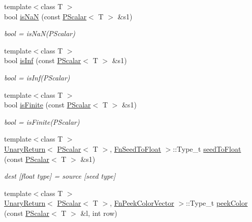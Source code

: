 \begin{DoxyCompactItemize}
{\footnotesize template$<$class T $>$ }\\bool \mbox{\hyperlink{group__primscalar_ga45c19c10ac52adfa3deff1ead05f3dbc}{is\+NaN}} (const \mbox{\hyperlink{classENSEM_1_1PScalar}{P\+Scalar}}$<$ T $>$ \&s1)
\begin{DoxyCompactList}\small\item\em bool = is\+Na\+N(\+P\+Scalar) \end{DoxyCompactList}\item 
{\footnotesize template$<$class T $>$ }\\bool \mbox{\hyperlink{group__primscalar_gadaa3bcd952c27bc79132fc1037584dcc}{is\+Inf}} (const \mbox{\hyperlink{classENSEM_1_1PScalar}{P\+Scalar}}$<$ T $>$ \&s1)
\begin{DoxyCompactList}\small\item\em bool = is\+Inf(\+P\+Scalar) \end{DoxyCompactList}\item 
{\footnotesize template$<$class T $>$ }\\bool \mbox{\hyperlink{group__primscalar_ga3dab2cae6c55a7a86676323b203a758d}{is\+Finite}} (const \mbox{\hyperlink{classENSEM_1_1PScalar}{P\+Scalar}}$<$ T $>$ \&s1)
\begin{DoxyCompactList}\small\item\em bool = is\+Finite(\+P\+Scalar) \end{DoxyCompactList}\item 
{\footnotesize template$<$class T $>$ }\\\mbox{\hyperlink{structENSEM_1_1UnaryReturn}{Unary\+Return}}$<$ \mbox{\hyperlink{classENSEM_1_1PScalar}{P\+Scalar}}$<$ T $>$, \mbox{\hyperlink{structENSEM_1_1FnSeedToFloat}{Fn\+Seed\+To\+Float}} $>$\+::Type\+\_\+t \mbox{\hyperlink{group__primscalar_ga5a261606d393edcbce00c050e5a5cbd5}{seed\+To\+Float}} (const \mbox{\hyperlink{classENSEM_1_1PScalar}{P\+Scalar}}$<$ T $>$ \&s1)
\begin{DoxyCompactList}\small\item\em dest \mbox{[}float type\mbox{]} = source \mbox{[}seed type\mbox{]} \end{DoxyCompactList}\item 
{\footnotesize template$<$class T $>$ }\\\mbox{\hyperlink{structENSEM_1_1UnaryReturn}{Unary\+Return}}$<$ \mbox{\hyperlink{classENSEM_1_1PScalar}{P\+Scalar}}$<$ T $>$, \mbox{\hyperlink{structENSEM_1_1FnPeekColorVector}{Fn\+Peek\+Color\+Vector}} $>$\+::Type\+\_\+t \mbox{\hyperlink{group__primscalar_ga99ea9420e1cb79a4dbc92fd7aab84f80}{peek\+Color}} (const \mbox{\hyperlink{classENSEM_1_1PScalar}{P\+Scalar}}$<$ T $>$ \&l, int row)

\end{DoxyCompactItemize}
